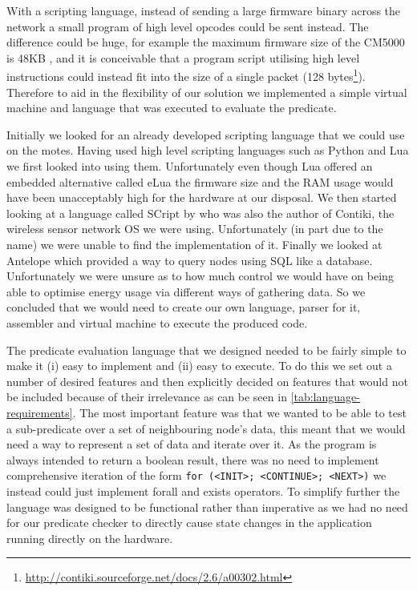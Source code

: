 With a scripting language, instead of sending a large firmware binary across the network a small program of high level opcodes could be sent instead. The difference could be huge, for example the maximum firmware size of the CM5000 is 48KB \cite{CM5000}, and it is conceivable that a program script utilising high level instructions could instead fit into the size of a single packet (128 bytes\footnote{\url{http://contiki.sourceforge.net/docs/2.6/a00302.html}}). Therefore to aid in the flexibility of our solution we implemented a simple virtual machine and language that was executed to evaluate the predicate.


Initially we looked for an already developed scripting language that we could use on the motes. Having used high level scripting languages such as Python and Lua we first looked into using them. Unfortunately even though Lua offered an embedded alternative called eLua \cite{elua} the firmware size and the RAM usage would have been unacceptably high for the hardware at our disposal. We then started looking at a language called SCript  \cite{dunkels06lowoverhead} by  \citeauthor{dunkels06lowoverhead} who was also the author of Contiki, the wireless sensor network OS we were using. Unfortunately (in part due to the name) we were unable to find the implementation of it. Finally we looked at Antelope \cite{Tsiftes:2011:DS:2070942.2070974} which provided a way to query nodes using SQL like a database. Unfortunately we were unsure as to how much control we would have on being able to optimise energy usage via different ways of gathering data. So we concluded that we would need to create our own language, parser for it, assembler and virtual machine to execute the produced code.


The predicate evaluation language that we designed needed to be fairly simple to make it (i) easy to implement and (ii) easy to execute. To do this we set out a number of desired features and then explicitly decided on features that would not be included because of their irrelevance as can be seen in \autoref{tab:language-requirements}. The most important feature was that we wanted to be able to test a sub-predicate over a set of neighbouring node's data, this meant that we would need a way to represent a set of data and iterate over it. As the program is always intended to return a boolean result, there was no need to implement comprehensive iteration of the form \verb|for (<INIT>; <CONTINUE>; <NEXT>)| we instead could just implement forall and exists operators. To simplify further the language was designed to be functional rather than imperative as we had no need for our predicate checker to directly cause state changes in the application running directly on the hardware.

